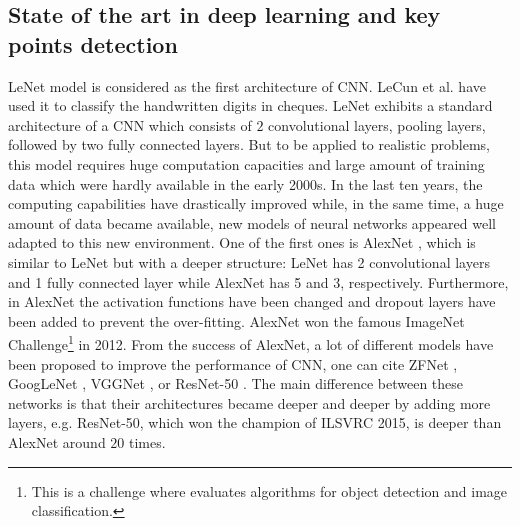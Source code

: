 \documentclass[review]{elsarticle}
\begin{document}
\subsection{State of the art in deep learning and key points detection}
LeNet \cite{lecun1998gradient} model is considered as the first
architecture of CNN. LeCun et al. \cite{lecun1998gradient} have used
it to classify the handwritten digits in cheques. LeNet exhibits a
standard architecture of a CNN which consists of $2$ convolutional
layers, pooling layers, followed by two fully connected layers. But to
be applied to realistic problems, this model requires huge computation
capacities and large amount of training data which were hardly
available in the early 2000s. In the last ten years, the computing
capabilities have drastically improved while, in the same time, a huge
amount of data became available, new models of neural networks
appeared well adapted to this new environment. One of the first ones
is AlexNet \cite{krizhevsky2012imagenet}, which is similar to LeNet
\cite{lecun1998gradient} but with a deeper structure: LeNet has 2
convolutional layers and 1 fully connected layer while AlexNet has 5
and 3, respectively. Furthermore, in AlexNet the activation functions
have been changed and dropout layers have been added to prevent the
over-fitting. AlexNet won the famous ImageNet Challenge\footnote{This
  is a challenge where evaluates algorithms for object detection and
  image classification.} in 2012. From the success of AlexNet, a lot
of different models have been proposed to improve the performance of
CNN, one can cite ZFNet  \cite{zeiler2014visualizing}, GoogLeNet
\cite{szegedy2015going}, VGGNet \cite{simonyan2014very}, or ResNet-50
\cite{he2016deep}. The main difference between these networks is that
their architectures became deeper and deeper by adding more layers,
e.g. ResNet-50, which won the champion of ILSVRC 2015, is deeper than
AlexNet around $20$ times.
\end{document}
